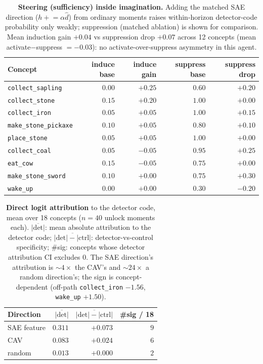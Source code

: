 \documentclass[11pt]{article}
\newcommand{\achname}[1]{\texttt{#1}}
\begin{document}
\begin{table}[h]
\centering
\caption{\textbf{Steering (sufficiency) inside imagination.} Adding the matched SAE direction ($h\mathrel{+}=\alpha\hat d$) from ordinary moments raises within-horizon detector-code probability only weakly; suppression (matched ablation) is shown for comparison. Mean induction gain $+0.04$ vs suppression drop $+0.07$ across 12 concepts (mean activate$-$suppress $=-0.03$): no activate-over-suppress asymmetry in this agent.}\label{stab:steer}
\begin{tabular}{@{}lrrrr@{}}
\toprule
Concept & induce base & induce gain & suppress base & suppress drop \\
\midrule
\achname{collect\_sapling}     & $0.00$ & $+0.25$ & $0.60$ & $+0.20$ \\
\achname{collect\_stone}       & $0.15$ & $+0.20$ & $1.00$ & $+0.00$ \\
\achname{collect\_iron}        & $0.05$ & $+0.05$ & $1.00$ & $+0.15$ \\
\achname{make\_stone\_pickaxe} & $0.10$ & $+0.05$ & $0.80$ & $+0.10$ \\
\achname{place\_stone}         & $0.05$ & $+0.05$ & $1.00$ & $+0.00$ \\
\achname{collect\_coal}        & $0.05$ & $-0.05$ & $0.95$ & $+0.25$ \\
\achname{eat\_cow}             & $0.15$ & $-0.05$ & $0.75$ & $+0.00$ \\
\achname{make\_stone\_sword}   & $0.10$ & $+0.00$ & $0.75$ & $+0.30$ \\
\achname{wake\_up}             & $0.00$ & $+0.00$ & $0.30$ & $-0.20$ \\
\bottomrule
\end{tabular}
\end{table}

\begin{table}[h]
\centering
\caption{\textbf{Direct logit attribution} to the detector code, mean over 18 concepts ($n{=}40$ unlock moments each). $\overline{|\text{det}|}$: mean absolute attribution to the detector code; $\overline{|\text{det}|-|\text{ctrl}|}$: detector-vs-control specificity; \#sig: concepts whose detector attribution CI excludes 0. The SAE direction's attribution is $\sim\!4\times$ the CAV's and $\sim\!24\times$ a random direction's; the sign is concept-dependent (off-path \achname{collect\_iron} $-1.56$, \achname{wake\_up} $+1.50$).}\label{stab:logit}
\begin{tabular}{@{}lrrr@{}}
\toprule
Direction & $\overline{|\text{det}|}$ & $\overline{|\text{det}|-|\text{ctrl}|}$ & \#sig / 18 \\
\midrule
SAE feature & $0.311$ & $+0.073$ & $9$ \\
CAV         & $0.083$ & $+0.024$ & $6$ \\
random      & $0.013$ & $+0.000$ & $2$ \\
\bottomrule
\end{tabular}
\end{table}
\end{document}
